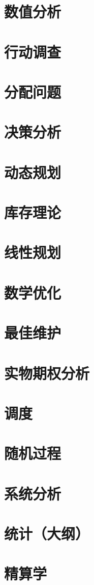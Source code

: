 \documentclass[UTF8]{NatureUniverse}
\begin{document}
\section{数值分析}
\section{行动调查}
\section{分配问题}
\section{决策分析}
\section{动态规划}
\section{库存理论}
\section{线性规划}
\section{数学优化}
\section{最佳维护}
\section{实物期权分析}
\section{调度}
\section{随机过程}
\section{系统分析}
\section{统计（大纲）}
\section{精算学}
\end{document}
